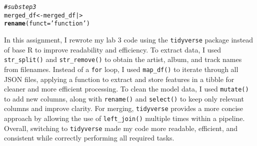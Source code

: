 \documentclass{article}\usepackage[]{graphicx}\usepackage[]{xcolor}
\makeatletter
\newcommand{\hlsng}[1]{\textcolor[rgb]{0.192,0.494,0.8}{#1}}%
\newcommand{\hlcom}[1]{\textcolor[rgb]{0.678,0.584,0.686}{\textit{#1}}}%
\newcommand{\hldef}[1]{\textcolor[rgb]{0.345,0.345,0.345}{#1}}%
\newcommand{\hlkwb}[1]{\textcolor[rgb]{0.69,0.353,0.396}{#1}}%
\newcommand{\hlkwc}[1]{\textcolor[rgb]{0.333,0.667,0.333}{#1}}%
\newcommand{\hlkwd}[1]{\textcolor[rgb]{0.737,0.353,0.396}{\textbf{#1}}}%
\newenvironment{kframe}{%
 \def\at@end@of@kframe{}%
 \ifinner\ifhmode%
  \def\at@end@of@kframe{\end{minipage}}%
  \begin{minipage}{\columnwidth}%
 \fi\fi%
 \def\FrameCommand##1{\hskip\@totalleftmargin \hskip-\fboxsep
 \colorbox{shadecolor}{##1}\hskip-\fboxsep
     \hskip-\linewidth \hskip-\@totalleftmargin \hskip\columnwidth}%
 \MakeFramed {\advance\hsize-\width
   \@totalleftmargin\z@ \linewidth\hsize
   \@setminipage}}%
 {\par\unskip\endMakeFramed%
 \at@end@of@kframe}
\newenvironment{knitrout}{}{} %
\makeatother
\begin{document}
\begin{enumerate}
\begin{knitrout}
\begin{kframe}
\begin{alltt}
\hlcom{#substep 3}
\hldef{merged_df} \hlkwb{<-} \hldef{merged_df |>}
  \hlkwd{rename}\hldef{(}\hlkwc{funct} \hldef{=} \hlsng{'function'}\hldef{)}
\end{alltt}
\end{kframe}
\end{knitrout}

In this assignment, I rewrote my lab 3 code using the \texttt{tidyverse} \citep{tidyverse} package
instead of base R to improve readability and efficiency. To extract data, I used  
\texttt{str\_split()} and \texttt{str\_remove()} to obtain the artist, album, and track names
from filenames. Instead of a \texttt{for} loop, I used \texttt{map\_df()} to iterate through
all JSON files, applying a function to extract and store features in a tibble for cleaner and more
efficient processing. To clean the model data, I used \texttt{mutate()} to add new columns, along
with \texttt{rename()} and \texttt{select()} to keep only relevant columns and improve clarity. For merging,
\texttt{tidyverse} provides a more concise approach by allowing the use of \texttt{left\_join()} multiple times
within a pipeline. Overall, switching to \texttt{tidyverse} made my code more readable, efficient, and consistent
while correctly performing all required tasks.

\end{enumerate}

\end{document}
